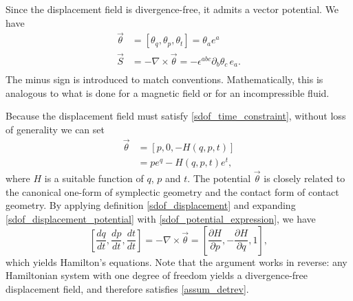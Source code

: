 \documentclass[fleqn,10pt]{wlscirep}
\begin{document}
Since the displacement field is divergence-free, it admits a vector potential. We have
\begin{equation}\label{sdof_displacement_potential}
	\begin{aligned}
		\vec{\theta} &= [\theta_q, \theta_p, \theta_t] = \theta_a e^a \\
		\vec{S} &= - \nabla \times \vec{\theta} = - \epsilon^{abc} \partial_b \theta_c \, e_a. \\
	\end{aligned}
\end{equation}
The minus sign is introduced to match conventions. Mathematically, this is analogous to what is done for a magnetic field or for an incompressible fluid.

Because the displacement field must satisfy \ref{sdof_time_constraint}, without loss of generality we can set
\begin{equation}\label{sdof_potential_expression}
	\begin{aligned}
		\vec{\theta} &= [p, 0, -H(q,p,t)] \\
		&= p e^q - H(q,p,t) e^t,
	\end{aligned}
\end{equation}
where $H$ is a suitable function of $q$, $p$ and $t$. The potential $\vec{\theta}$ is closely related to the canonical one-form of symplectic geometry and the contact form of contact geometry. By applying definition \ref{sdof_displacement} and expanding \ref{sdof_displacement_potential} with \ref{sdof_potential_expression}, we have
\begin{equation}\label{sdof_Ham_eq}
	\left[ \frac{dq}{dt},\frac{dp}{dt},\frac{dt}{dt} \right] = - \nabla \times \vec{\theta} = \left[ \frac{\partial H}{\partial p},-\frac{\partial H}{\partial q}, 1 \right],
\end{equation}
which yields Hamilton's equations. Note that the argument works in reverse: any Hamiltonian system with one degree of freedom yields a divergence-free displacement field, and therefore satisfies \ref{assum_detrev}.
\end{document}

